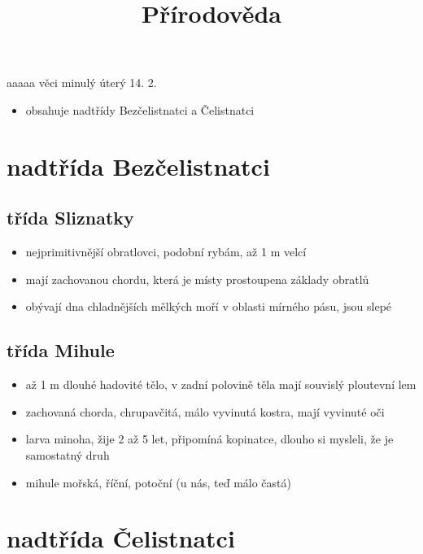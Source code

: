 \documentclass{article}
\title{\vspace{-2cm}Přírodověda\vspace{-1.7cm}}
\date{}
\author{}
\begin{document}
\maketitle

aaaaa věci minulý úterý 14. 2.
\begin{itemize}
  \item obsahuje nadtřídy Bezčelistnatci a Čelistnatci
\end{itemize}

\section{nadtřída Bezčelistnatci}

\subsection{třída Sliznatky}
\begin{itemize}
  \item nejprimitivnější obratlovci, podobní rybám, až 1 m velcí
  \item mají zachovanou chordu, která je místy prostoupena základy obratlů
  \item obývají dna chladnějších mělkých moří v oblasti mírného pásu, jsou slepé
\end{itemize}

\subsection{třída Mihule}
\begin{itemize}
  \item až 1 m dlouhé hadovité tělo, v zadní polovině těla mají souvislý ploutevní lem
  \item zachovaná chorda, chrupavčitá, málo vyvinutá kostra, mají vyvinuté oči
  \item larva minoha, žije 2 až 5 let, připomíná kopinatce, dlouho si mysleli, že je samostatný druh
  \item mihule mořská, říční, potoční (u nás, teď málo častá)
\end{itemize}

\section{nadtřída Čelistnatci}
\end{document}
